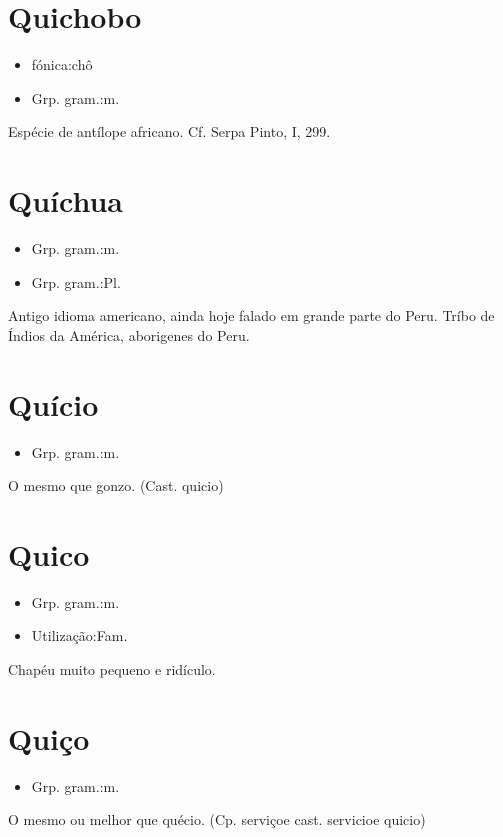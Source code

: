 \section{Quichobo}
\begin{itemize}
\item {fónica:chô}
\end{itemize}
\begin{itemize}
\item {Grp. gram.:m.}
\end{itemize}
Espécie de antílope africano. Cf. Serpa Pinto, I, 299.
\section{Quíchua}
\begin{itemize}
\item {Grp. gram.:m.}
\end{itemize}
\begin{itemize}
\item {Grp. gram.:Pl.}
\end{itemize}
Antigo idioma americano, ainda hoje falado em grande parte do Peru.
Tríbo de Índios da América, aborigenes do Peru.
\section{Quício}
\begin{itemize}
\item {Grp. gram.:m.}
\end{itemize}
O mesmo que \textunderscore gonzo\textunderscore .
(Cast. \textunderscore quicio\textunderscore )
\section{Quico}
\begin{itemize}
\item {Grp. gram.:m.}
\end{itemize}
\begin{itemize}
\item {Utilização:Fam.}
\end{itemize}
Chapéu muito pequeno e ridículo.
\section{Quiço}
\begin{itemize}
\item {Grp. gram.:m.}
\end{itemize}
O mesmo ou melhor que \textunderscore quécio\textunderscore .
(Cp. \textunderscore serviço\textunderscore  e cast. \textunderscore servicio\textunderscore  e \textunderscore quicio\textunderscore )
